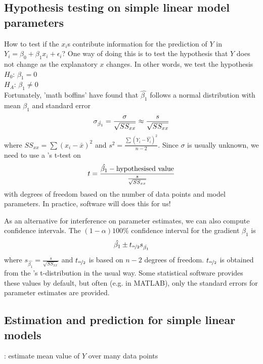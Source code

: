 \subsection{Hypothesis testing on simple linear model parameters}

How to test if the $x_i$s contribute information for the prediction of $Y$ in $Y_i=\beta_0+\beta_1x_i+\epsilon_i$? One way of doing this is to test the hypothesis that $Y$ does not change as the explanatory $x$ changes. In other words, we test the hypothesis \\
$H_0$: $\beta_1=0$ \\
$H_A$: $\beta_1\neq 0$ \\
Fortunately, 'math boffins' have found that $\hat{\beta_1}$ follows a normal distribution with mean $\beta_1$ and standard error 
\begin{align}
	\sigma_{\hat{\beta_1}} = \frac{\sigma}{\sqrt{SS_{xx}}}\approx \frac{s}{\sqrt{SS_{xx}}}\notag
\end{align}
where $SS_{xx}=\sum(x_i-\bar{x})^2$ and $s^2=\frac{\sum (Y_i-\hat{Y_i})^2}{n-2}$. Since $\sigma$ is usually unknown, we need to use a 's t-test on
\begin{align}
	t = \frac{\hat{\beta_1}-\text{hypothesised value}}{\frac{s}{\sqrt{SS_{xx}}}} \notag
\end{align}
with degrees of freedom based on the number of data points and model parameters. In practice, software will does this for us!

As an alternative for interference on parameter estimates, we can also compute confidence intervals. The $(1-\alpha)100\%$ confidence interval for the gradient $\beta_1$ is
\begin{align}
	\hat{\beta_1}\pm t_{\nicefrac{\alpha}{2}}s_{\hat{\beta_1}}\notag 
\end{align}
where $s_{\hat{\beta_1}} = \frac{s}{\sqrt{SS_{xx}}}$ and $t_{\nicefrac{\alpha}{2}}$ is based on $n-2$ degrees of freedom. $t_{\nicefrac{\alpha}{2}}$ is obtained from the 's t-distribution in the usual way. Some statistical software provides these values by default, but often (e.g. in MATLAB), only the standard errors for parameter estimates are provided.

\subsection{Estimation and prediction for simple linear models}

\begin{definition}[estimation]
	: estimate mean value of $Y$ over many data points
\end{definition}


